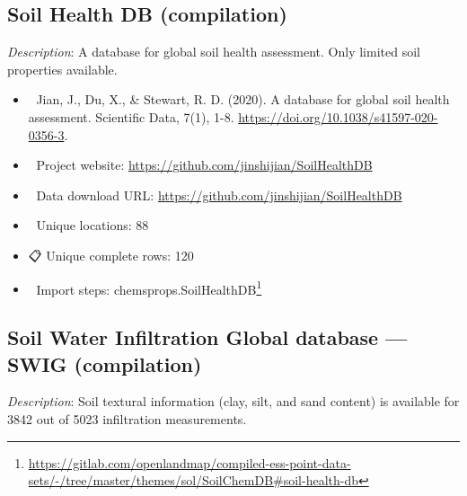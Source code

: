 \documentclass[
  graybox,natbib,nospthms]{svmono}
\providecommand{\tightlist}{%
  \setlength{\itemsep}{0pt}\setlength{\parskip}{0pt}}
\providecommand{\tightlist}{\setlength{\itemsep}{0pt}\setlength{\parskip}{0pt}}
\renewcommand{\href}[2]{#2 (\url{#1})}
\renewcommand{\href}[2]{#2\footnote{\url{#1}}}
\begin{document}
\hypertarget{soil-health-db-compilation}{%
\subsection{Soil Health DB (compilation)}\label{soil-health-db-compilation}}

\emph{Description}: A database for global soil health assessment. Only limited soil properties
available.

\begin{itemize}
\tightlist
\item
  📕 Jian, J., Du, X., \& Stewart, R. D. (2020). A database for global soil health assessment. Scientific Data, 7(1), 1-8. \url{https://doi.org/10.1038/s41597-020-0356-3}.\\
\item
  🔗 Project website: \url{https://github.com/jinshijian/SoilHealthDB}\\
\item
  📂 Data download URL: \url{https://github.com/jinshijian/SoilHealthDB}\\
\item
  📍 Unique locations: 88\\
\item
  📋 Unique complete rows: 120\\
\item
  📝 Import steps: \href{https://gitlab.com/openlandmap/compiled-ess-point-data-sets/-/tree/master/themes/sol/SoilChemDB\#soil-health-db}{chemsprops.SoilHealthDB}
\end{itemize}

\hypertarget{soil-water-infiltration-global-database-swig-compilation}{%
\subsection{Soil Water Infiltration Global database --- SWIG (compilation)}\label{soil-water-infiltration-global-database-swig-compilation}}

\emph{Description}: Soil textural information (clay, silt, and sand content) is available for 3842 out of 5023 infiltration measurements.
\end{document}
